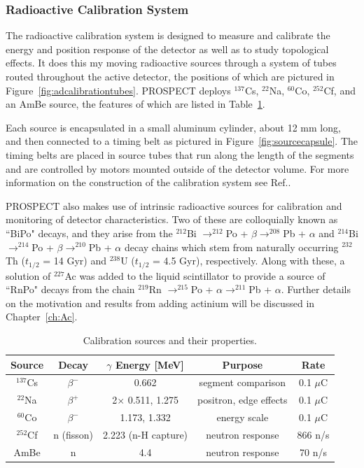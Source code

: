 \subsubsection{Radioactive Calibration System}

The radioactive calibration system is designed to measure and calibrate the energy and position response of the detector as well as to study topological effects. 
It does this my moving radioactive sources through a system of tubes routed throughout the active detector, the positions of which are pictured in Figure~\ref{fig:adcalibrationtubes}.
PROSPECT deploys $^{137}$Cs, $^{22}$Na, $^{60}$Co, $^{252}$Cf, and an AmBe source, the features of which are listed in Table~\ref{tab:Sources}.

Each source is encapsulated in a small aluminum cylinder, about 12 mm long, and then connected to a timing belt as pictured in Figure~\ref{fig:sourcecapsule}.
The timing belts are placed in source tubes that run along the length of the segments and are controlled by motors mounted outside of the detector volume. 
For more information on the construction of the calibration system see Ref.\cite{Ashenfelter:2019jzp}.

PROSPECT also makes use of intrinsic radioactive sources for calibration and monitoring of detector characteristics. 
Two of these are colloquially known as ``BiPo" decays, and they arise from the $^{212}$Bi $\rightarrow ^{212}$Po + $\beta \rightarrow ^{208}$Pb + $\alpha$ and $^{214}$Bi $\rightarrow ^{214}$Po + $\beta \rightarrow ^{210}$Pb + $\alpha$ decay chains which stem from naturally occurring $^{232}$Th ($t_{1/2}$ = 14 Gyr) and $^{238}$U ($t_{1/2}$ = 4.5 Gyr), respectively.
Along with these, a solution of $^{227}$Ac was added to the liquid scintillator to provide a source of ``RnPo" decays from the chain $^{219}$Rn $\rightarrow ^{215}$Po + $\alpha \rightarrow ^{211}$Pb + $\alpha$.
Further details on the motivation and results from adding actinium will be discussed in Chapter~\ref{ch:Ac}.


\begin{table}[t]
\begin{tabular}{|c|c|c|c|c|}
	\hline 
	\bf{Source} & \bf{Decay} & \bf{$\gamma$ Energy [MeV]} & Purpose & Rate \\ 
	\hline 
	$^{137}$Cs & $\beta^-$ & 0.662 & segment comparison & 0.1 $\mu$C \\ 
	\hline 
	$^{22}$Na & $\beta^+$ & 2$\times$ 0.511, 1.275 & positron, edge effects & 0.1 $\mu$C \\ 
	\hline 
	$^{60}$Co & $\beta^-$ & 1.173, 1.332 & energy scale & 0.1 $\mu$C \\ 
	\hline 
	$^{252}$Cf & n (fisson) & 2.223 (n-H capture) & neutron response & 866 n/s \\ 
	\hline 
	AmBe & n & 4.4 & neutron response & 70 n/s \\ 
	\hline 
\end{tabular} 
\caption[Calibration sources]{Calibration sources and their properties.}
\label{tab:Sources}
\end{table}

